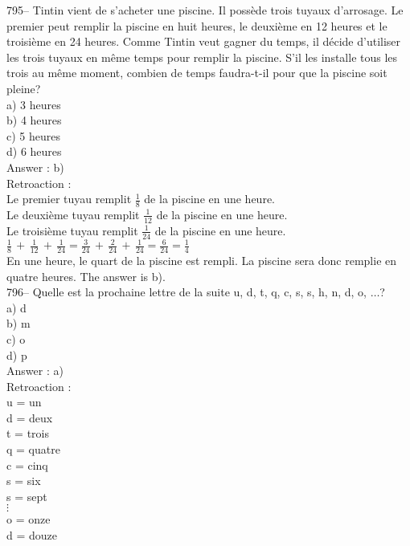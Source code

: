 ﻿\documentclass[letterpaper, 12pt]{article}
\begin{document}
795-- Tintin vient de s'acheter une piscine.  Il poss\`ede trois tuyaux
d'arrosage.  Le premier peut remplir la piscine en huit heures, le
deuxi\`eme en 12 heures et le troisi\`eme en 24 heures.  Comme Tintin veut
gagner du temps, il d\'ecide d'utiliser les trois tuyaux en m\^eme temps
pour remplir la piscine.  S'il les installe tous les trois au m\^eme moment,
combien de temps faudra-t-il pour que la piscine soit pleine?\\
a) 3 heures\\
b) 4 heures\\
c) 5 heures\\
d) 6 heures\\

Answer : b)\\

Retroaction : \\
Le premier tuyau remplit $\frac{1}{8}$ de la piscine en une heure.\\[2mm]
Le deuxi\`eme tuyau remplit $\frac{1}{12}$ de la piscine en une
heure.\\[2mm]
Le troisi\`eme tuyau remplit $\frac{1}{24}$ de la piscine en une
heure.\\[2mm]
$\frac{1}{8}\,+\,\frac{1}{12}\,+\,\frac{1}{24}=\frac{3}{24}\,+\,\frac{2}{24}\,+\,\frac{1}{24}=\frac{6}{24}=\frac{1}{4}$\\[2mm]
En une heure, le quart de la piscine est rempli.  La piscine sera donc
remplie en quatre heures.  The answer is b).\\

796-- Quelle est la prochaine lettre de la suite u, d, t, q, c, s, s, h, n,
d, o, $\ldots$?\\
a) d\\
b) m\\
c) o\\
d) p\\

Answer : a)\\

Retroaction : \\
u = un\\
d = deux\\
t = trois\\
q = quatre\\
c = cinq\\
s = six\\
s = sept\\
$\vdots$\\
o = onze\\
d = douze\\
\end{document}
